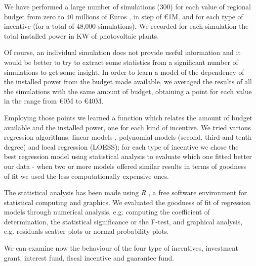 \documentclass [twocolumn,a4paper,10pt]{ECMS}
\begin{document}
We have performed a large number of simulations (300) for each value of regional budget from zero to 40 millions of Euros , in step of \euro1M, and for each type of incentive (for a total of 48,000 simulations). We recorded for each simulation the total installed power in KW of photovoltaic plants. 

Of course, an individual simulation does not provide useful information and it would be better to try to extract some statistics from a significant number of simulations to get some insight. In order to learn a model of the dependency of the installed power from the budget made available, we averaged the results of all the simulations with the same amount of budget, obtaining a point for each value in the range from \euro0M to \euro40M.


Employing those points we learned a function which relates the amount of budget available and the installed power, one for each kind of incentive. We tried various regression algorithms: linear models \citep{Rousseeuw1987}, polynomial models \citep{Stigler1974431,Gergonne1974439} (second, third and tenth degree) and local regression \citep{lowess} (LOESS); for each type of incentive we chose the best regression model using statistical analysis to evaluate which one fitted better our data - when two or more models offered similar results in terms of goodness of fit we used the less computationally expensive ones.

The statistical analysis has been made using \emph{R} \citep{Rlanguage}, a free software environment for statistical computing and graphics. We evaluated the goodness of fit of regression models through numerical analysis, e.g. computing the coefficient of determination, the statistical significance or the F-test, and graphical analysis, e.g. residuals scatter plots or normal probability plots.

We can examine now the behaviour of the four type of incentives, investment grant, interest fund, fiscal incentive and guarantee fund.
\end{document}
